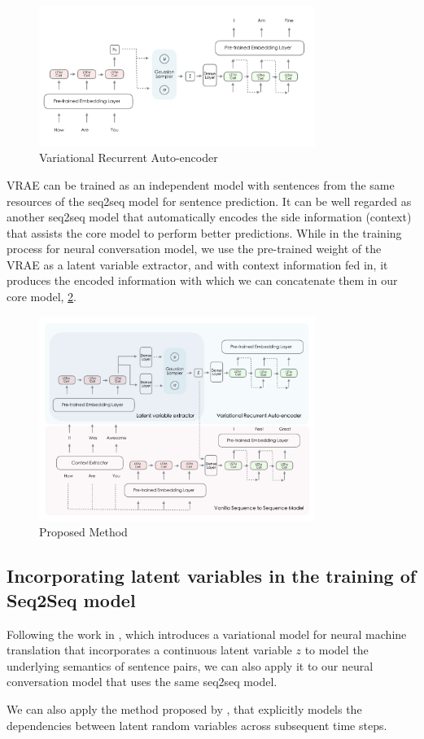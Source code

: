 \begin{figure}[]
\centering
\includegraphics[width=0.8\textwidth]{VRAE.png}
\caption{Variational Recurrent Auto-encoder}
\label{fig:vrae}
\end{figure}

VRAE can be trained as an independent model with sentences from the same resources of the seq2seq model for sentence prediction. It can be well regarded as another seq2seq model that automatically encodes the side information (context) that assists the core model to perform better predictions. While in the training process for neural conversation model, we use the pre-trained weight of the VRAE as a latent variable extractor, and with context information fed in, it produces the encoded information with which we can concatenate them in our core model, \ref{fig:proposed}.

\begin{figure}[]
\centering
\includegraphics[width=0.8\textwidth]{proposed.png}
\caption{Proposed Method}
\label{fig:proposed}
\end{figure}

\subsection{Incorporating latent variables in the training of Seq2Seq model}

Following the work in \cite{vnmt}, which introduces a variational model for neural machine translation that incorporates a continuous latent variable $z$ to model the underlying semantics of sentence pairs, we can also apply it to our neural conversation model that uses the same seq2seq model. 

We can also apply the method proposed by \cite{vrnn}, that explicitly models the dependencies between latent random variables across subsequent time steps.
